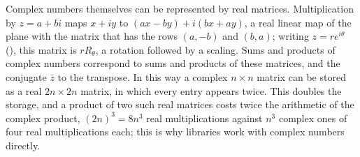 \begin{table}
\end{table}

Complex numbers themselves can be represented by real matrices. Multiplication by $z=a+bi$ maps $x+iy$ to $(ax-by)+i(bx+ay)$, a real linear map of the plane with the matrix that has the rows $(a,-b)$ and $(b,a)$; writing $z=re^{i\theta}$ (), this matrix is $rR_\theta$, a rotation followed by a scaling. Sums and products of complex numbers correspond to sums and products of these matrices, and the conjugate $\bar z$ to the transpose. In this way a complex $n\times n$ matrix can be stored as a real $2n\times2n$ matrix, in which every entry appears twice. This doubles the storage, and a product of two such real matrices costs twice the arithmetic of the complex product, $(2n)^3=8n^3$ real multiplications against $n^3$ complex ones of four real multiplications each; this is why libraries work with complex numbers directly.

